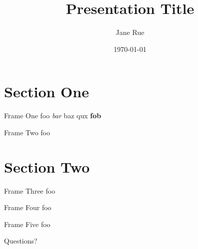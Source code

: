 \documentclass[aspectratio=1610]{beamer}
\title{Presentation Title}
\date{\today}
\author{Jane Rue}
\begin{document}

	\maketitle


	\section{Section One}


	\begin{frame}{Frame One}
		foo \emph{bar} baz \alert{qux} \textbf{fob}
	\end{frame}


	\begin{frame}{Frame Two}
		foo
	\end{frame}


	\section{Section Two}


	\begin{frame}{Frame Three}
		foo
	\end{frame}


	\begin{frame}{Frame Four}
		foo
	\end{frame}


	\begin{frame}{Frame Five}
		foo
	\end{frame}


	\begin{frame}[standout]
		Questions?
	\end{frame}
\end{document}
